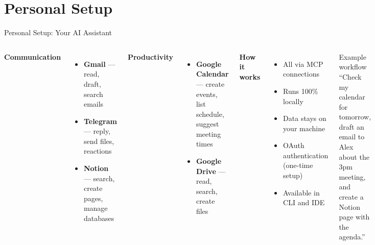 \documentclass[aspectratio=169]{beamer}
\begin{document}
\section{Personal Setup}

\begin{frame}{Personal Setup: Your AI Assistant}
\begin{columns}[T]
\textbf{\color{popblue}Communication}
\begin{itemize}
  \item \textbf{Gmail} --- read, draft, search emails
  \item \textbf{Telegram} --- reply, send files, reactions
  \item \textbf{Notion} --- search, create pages, manage databases
\end{itemize}

\bigskip
\textbf{\color{paramgreen}Productivity}
\begin{itemize}
  \item \textbf{Google Calendar} --- create events, list schedule, suggest meeting times
  \item \textbf{Google Drive} --- read, search, create files
\end{itemize}

\textbf{\color{orange1}How it works}
\begin{itemize}
  \item All via MCP connections
  \item Runs 100\% locally
  \item Data stays on your machine
  \item OAuth authentication (one-time setup)
  \item Available in CLI and IDE
\end{itemize}

\bigskip
\begin{exampleblock}{Example workflow}
``Check my calendar for tomorrow, draft an email to Alex about the 3pm meeting, and create a Notion page with the agenda.''
\end{exampleblock}
\end{columns}
\end{frame}

\end{document}
